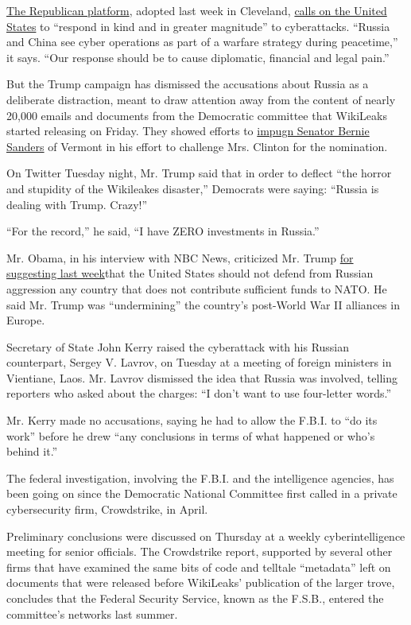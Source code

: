 \href{https://www.nytimes.com/2016/07/19/us/politics/republican-party-issues.html}{The
Republican platform}, adopted last week in Cleveland,
\href{https://www.gop.com/the-2016-republican-party-platform/}{calls on
the United States} to ``respond in kind and in greater magnitude'' to
cyberattacks. ``Russia and China see cyber operations as part of a
warfare strategy during peacetime,'' it says. ``Our response should be
to cause diplomatic, financial and legal pain.''

But the Trump campaign has dismissed the accusations about Russia as a
deliberate distraction, meant to draw attention away from the content of
nearly 20,000 emails and documents from the Democratic committee that
WikiLeaks started releasing on Friday. They showed efforts to
\href{https://www.nytimes.com/2016/07/23/us/politics/dnc-emails-sanders-clinton.html}{impugn
Senator Bernie Sanders} of Vermont in his effort to challenge Mrs.
Clinton for the nomination.

On Twitter Tuesday night, Mr. Trump said that in order to deflect ``the
horror and stupidity of the Wikileakes disaster,'' Democrats were
saying: ``Russia is dealing with Trump. Crazy!''

``For the record,'' he said, ``I have ZERO investments in Russia.''

Mr. Obama, in his interview with NBC News, criticized Mr. Trump
\href{http://www.nytimes.com/2016/07/21/us/politics/donald-trump-issues.html}{for
suggesting last week}that the United States should not defend from
Russian aggression any country that does not contribute sufficient funds
to NATO. He said Mr. Trump was ``undermining'' the country's post-World
War II alliances in Europe.

Secretary of State John Kerry raised the cyberattack with his Russian
counterpart, Sergey V. Lavrov, on Tuesday at a meeting of foreign
ministers in Vientiane, Laos. Mr. Lavrov dismissed the idea that Russia
was involved, telling reporters who asked about the charges: ``I don't
want to use four-letter words.''

Mr. Kerry made no accusations, saying he had to allow the F.B.I. to ``do
its work'' before he drew ``any conclusions in terms of what happened or
who's behind it.''

The federal investigation, involving the F.B.I. and the intelligence
agencies, has been going on since the Democratic National Committee
first called in a private cybersecurity firm, Crowdstrike, in April.

Preliminary conclusions were discussed on Thursday at a weekly
cyberintelligence meeting for senior officials. The Crowdstrike report,
supported by several other firms that have examined the same bits of
code and telltale ``metadata'' left on documents that were released
before WikiLeaks' publication of the larger trove, concludes that the
Federal Security Service, known as the F.S.B., entered the committee's
networks last summer.

